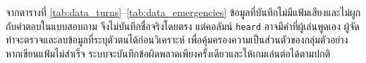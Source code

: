 จากตารางที่ \ref{tab:data_turns}--\ref{tab:data_emergencies} ข้อมูลที่บันทึกไม่มีแฟ้มเสียงและไม่ผูกกับคำตอบในแบบสอบถาม จึงไม่บันทึกชื่อจริงโดยตรง แต่คอลัมน์ \texttt{heard} อาจมีคำที่ผู้เล่นพูดเอง ผู้จัดทำจะตรวจและลบข้อมูลที่ระบุตัวตนได้ก่อนวิเคราะห์ เพื่อคุ้มครองความเป็นส่วนตัวของกลุ่มตัวอย่าง หากเขียนแฟ้มไม่สำเร็จ ระบบจะบันทึกข้อผิดพลาดเพียงครั้งเดียวและให้เกมเล่นต่อได้ตามปกติ
